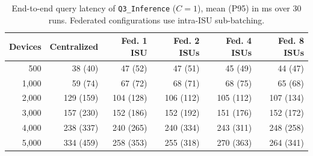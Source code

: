 \begin{table}[t]
\centering
\caption{End-to-end query latency of \texttt{Q3\_Inference} ($C=1$), mean (P95) in ms over 30 runs. Federated configurations use intra-ISU sub-batching.}
\label{tab:query-exp1}
\begin{tabular}{rrrrrr}
\toprule
Devices & Centralized & Fed. 1 ISU & Fed. 2 ISUs & Fed. 4 ISUs & Fed. 8 ISUs \\
\midrule
500 & 38 (40) & 47 (52) & 47 (51) & 45 (49) & 44 (47) \\
1,000 & 59 (74) & 67 (72) & 68 (71) & 68 (75) & 65 (68) \\
2,000 & 129 (159) & 104 (128) & 106 (112) & 105 (112) & 107 (134) \\
3,000 & 157 (230) & 152 (186) & 152 (192) & 151 (176) & 152 (172) \\
4,000 & 238 (337) & 240 (265) & 240 (334) & 243 (311) & 248 (258) \\
5,000 & 334 (459) & 258 (353) & 255 (318) & 270 (363) & 264 (341) \\
\bottomrule
\end{tabular}
\end{table}
